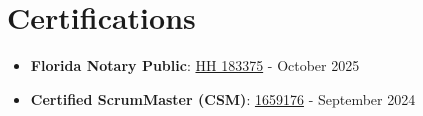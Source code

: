 \documentclass[letterpaper,]{article}
\newcommand{\resumeItem}[2]{
  \item\small{
    \textbf{#1}{: #2 \vspace{-2pt}}
  }
}
\newcommand{\resumeSubItem}[2]{\resumeItem{#1}{#2}\vspace{-4pt}}
\newcommand{\resumeSubHeadingListStart}{\begin{itemize}[leftmargin=*]}
\newcommand{\resumeSubHeadingListEnd}{\end{itemize}}
\begin{document}
\section{Certifications}

  \resumeSubHeadingListStart
    \resumeSubItem{Florida Notary Public}
      {\href{https://notaries.dos.state.fl.us/notidsearch.asp?id=1682252}{HH 183375}} - {{October 2025}}
      
      \resumeSubItem{Certified ScrumMaster (CSM)}
      {\href{https://bcert.me/bc/html/profile.jsp?k=gberipx}{1659176}} - {{September 2024}}

  \resumeSubHeadingListEnd





\end{document}
